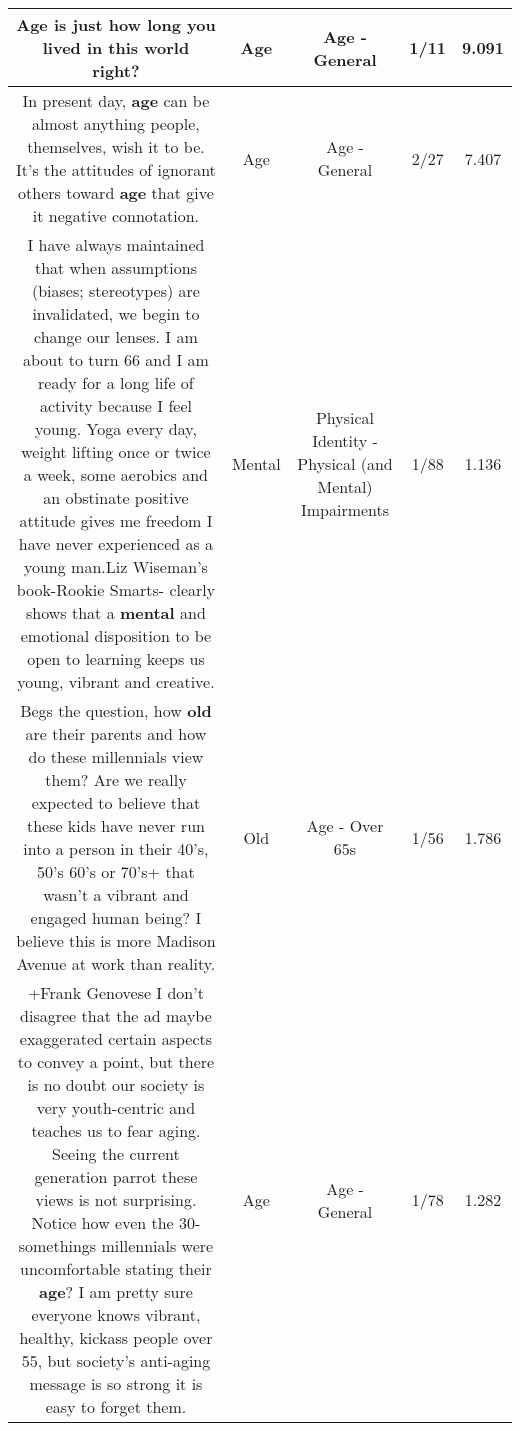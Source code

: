 \documentclass[11pt]{article}
\newlength\mylength
\begin{document}
\begin{center}
\begin{longtable}{|C{.65\mylength}|C{.30\mylength}|C{.12\mylength}|C{.12\mylength}|C{.12\mylength}|}
  \small Age is just how long you lived in this world right?\normalsize   & Age & Age - General & 1/11 & 9.091 \\  \hline
  \small In present day, \textbf{age} can be almost anything people, themselves, wish it to be. It's the attitudes of ignorant others toward \textbf{age} that give it negative connotation.\normalsize   & Age & Age - General & 2/27 & 7.407 \\  \hline
  \small I have always maintained that when assumptions (biases; stereotypes) are invalidated, we begin to change our lenses. I am about to turn 66 and I am ready for a long life of activity because I feel young. Yoga every day, weight lifting once or twice a week, some aerobics and an obstinate  positive attitude gives me freedom I have never experienced as a young man.Liz Wiseman's book-Rookie Smarts- clearly shows that a \textbf{mental} and emotional disposition to be open to learning keeps us young, vibrant and creative.\normalsize   & Mental & Physical Identity - Physical (and Mental) Impairments & 1/88 & 1.136 \\  \hline
  \small Begs the question, how \textbf{old} are their parents and how do these millennials view them?  Are we really expected to believe that these kids have never run into a person in their 40's, 50's 60's or 70's+ that wasn't a vibrant and engaged human being?  I believe this is more Madison Avenue at work than reality.\normalsize   & Old & Age - Over 65s & 1/56 & 1.786 \\  \hline
  \small +Frank Genovese I don't disagree that the ad maybe exaggerated certain aspects to convey a point, but there is no doubt our society is very youth-centric and teaches us to fear aging. Seeing the current generation parrot these views is not surprising. Notice how even the 30-somethings millennials were uncomfortable stating their \textbf{age}? I am pretty sure everyone knows vibrant, healthy, kickass people over 55, but society's anti-aging message is so strong it is easy to forget them.\normalsize   & Age & Age - General & 1/78 & 1.282 \\  \hline

\end{longtable}
\end{center}
\end{document}
